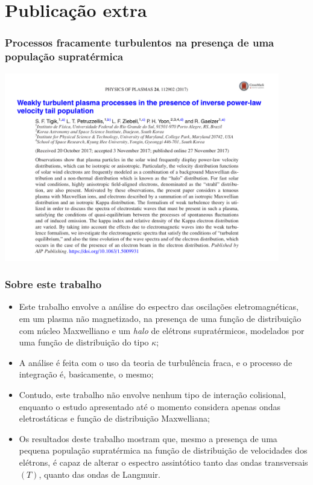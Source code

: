 \documentclass[10pt,aspectratio=1610,lualatex]{beamer}
\begin{document}
\section{Publicação extra}
\begin{frame}
  \frametitle{Processos fracamente turbulentos na presença de
    uma população supratérmica}
   \centering \includegraphics[width=0.9\textwidth]{print_Tigik2017b.png}
\end{frame}

\begin{frame}
  \frametitle{Sobre este trabalho}
  \begin{itemize}
    \item Este trabalho envolve a análise do espectro das oscilações
    eletromagnéticas, em um plasma não magnetizado, na presença de uma
    função de distribuição com núcleo Maxwelliano e um \emph{halo} de
    elétrons supratérmicos, modelados por uma função de distribuição
    do tipo $\kappa$;
    \vspace{0.2cm}
    \pause
    \item A análise é feita com o uso da teoria de turbulência fraca,
    e o processo de integração é, basicamente, o mesmo;
    \vspace{0.2cm}
    \pause
    \item Contudo, este trabalho não envolve nenhum tipo de interação
      colisional, enquanto o estudo apresentado até o momento considera
      apenas ondas eletrostáticas e função de distribuição Maxwelliana;
    \vspace{0.2cm}
    \pause
    \item Os resultados deste trabalho mostram que, mesmo a presença de
    uma pequena população supratérmica na função de distribuição de
    velocidades dos elétrons, é capaz de alterar o espectro assintótico
    tanto das ondas transversais  $(T)$, quanto das ondas de Langmuir.
  \end{itemize}
\end{frame}
\end{document}
